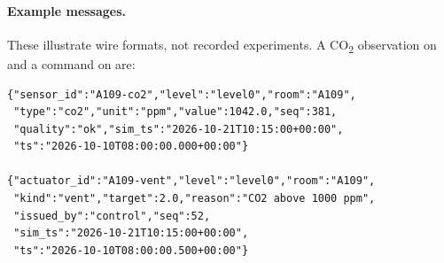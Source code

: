\documentclass[11pt,a4paper]{article}
\begin{document}
\paragraph{Example messages.}
These illustrate wire formats, not recorded experiments. A CO\textsubscript{2} observation on \protect{} and a command on \protect{} are:
{\small\begin{verbatim}
{"sensor_id":"A109-co2","level":"level0","room":"A109",
 "type":"co2","unit":"ppm","value":1042.0,"seq":381,
 "quality":"ok","sim_ts":"2026-10-21T10:15:00+00:00",
 "ts":"2026-10-10T08:00:00.000+00:00"}

{"actuator_id":"A109-vent","level":"level0","room":"A109",
 "kind":"vent","target":2.0,"reason":"CO2 above 1000 ppm",
 "issued_by":"control","seq":52,
 "sim_ts":"2026-10-21T10:15:00+00:00",
 "ts":"2026-10-10T08:00:00.500+00:00"}
\end{verbatim}}
\end{document}
